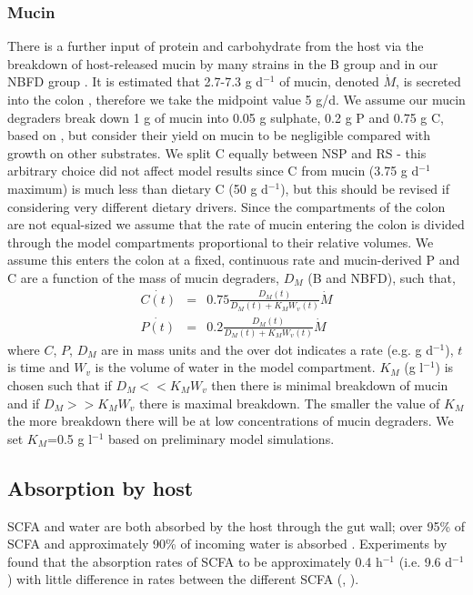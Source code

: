 \documentclass[a4paper]{article}
\begin{document}
\subsubsection*{Mucin}
There is a further input of protein and carbohydrate from the host via the breakdown of host-released mucin by many strains in the B group \citep{Racheev} and in our NBFD group \citep{crost}. It is estimated that 2.7-7.3 g d$^{-1}$ of mucin, denoted $\dot{M}$, is secreted into the colon \citep{florin}, therefore we take the midpoint value 5 g/d.  We assume our mucin degraders break down 1 g of mucin into 0.05 g sulphate, 0.2 g P and 0.75 g C, based on \cite{Sung}, but consider their yield on mucin to be negligible compared with growth on other substrates. 
We split C equally between NSP and RS - this arbitrary choice did not affect model results since C from mucin (3.75 g d$^{-1}$ maximum) is much less than dietary C (50 g d$^{-1}$), but this should be revised if considering very different dietary drivers.
Since the compartments of the colon are not equal-sized we assume that the rate of mucin entering the colon is divided through the model compartments proportional to their relative volumes.
We assume this enters the colon at a fixed, continuous rate and mucin-derived P and C are a function of the mass of mucin degraders, $D_M$ (B and NBFD), such that,
\begin{eqnarray}
    \dot{C(t)}&=&0.75\frac{D_M(t)}{D_M(t)+K_MW_v(t)}\dot{M}\\
    \dot{P(t)}&=&0.2\frac{D_M(t)}{D_M(t)+K_MW_v(t)}\dot{M}
\end{eqnarray}
where $C$, $P$, $D_M$ are in mass units and the over dot indicates a rate (e.g. g d$^{-1}$), $t$ is time  and $W_v$ is the volume of water in the model compartment. $K_M$ (g l$^{-1}$) is chosen such that if $D_M<<K_MW_v$ then there is minimal breakdown of mucin and if $D_M>>K_MW_v$ there is maximal breakdown. The smaller the value of $K_M$ the more breakdown there will be at low concentrations of mucin degraders. We set $K_M$=0.5 g l$^{-1}$ based on preliminary model simulations.


\subsection*{Absorption by host}
SCFA and water are both absorbed by the host through the gut wall; over 95\% of SCFA \citep{Topping} and approximately 90\% of incoming water is absorbed \citep{Phillips}.
Experiments by \cite{Ruppin} found that the absorption rates of SCFA to be approximately 0.4 h$^{-1}$ (i.e. 9.6  d$^{-1}$) with little difference in rates between the different SCFA (\cite{Ruppin}, \cite{Topping}).
\end{document}
